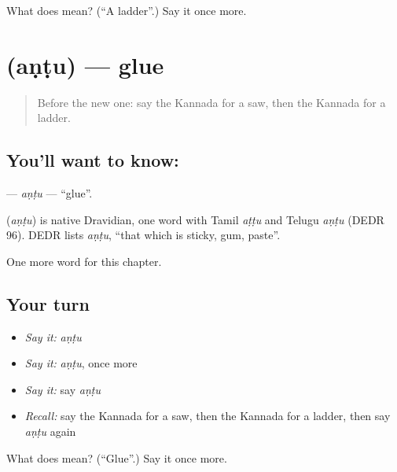 \begin{tcolorbox}[breakable,colback=teal!4,colframe=teal!35!black,title={Before you move on}]
What does  mean? (\textquotedblleft{}A ladder\textquotedblright{}.) Say it once more.
\end{tcolorbox}
\section[\texorpdfstring{\kn{ಅಂಟು} (aṇṭu)}{ಅಂಟು (aṇṭu)}]{ (aṇṭu) — glue}

\label{lesson:KA-C227-antu}



\begin{quote}
Before the new one: say the Kannada for a saw, then the Kannada for a ladder.
\end{quote}

\subsection*{You'll want to know: }
\textbf{} — \emph{aṇṭu} — \textquotedblleft{}glue\textquotedblright{}.

\begin{cousinweb}
\textbf{} (\emph{aṇṭu}) is native Dravidian, one word with Tamil \emph{aṭṭu} and Telugu \emph{aṇṭu} (DEDR 96). DEDR lists \emph{aṇṭu}, \textquotedblleft{}that which is sticky, gum, paste\textquotedblright{}.
\end{cousinweb}

\begin{grammarlens}[title={What you've built}]
One more word for this chapter.
\end{grammarlens}

\subsection*{Your turn}
\begin{itemize}
\raggedright
  \item \emph{Say it:} \emph{aṇṭu}
  \item \emph{Say it:} \emph{aṇṭu}, once more
  \item \emph{Say it:} say \emph{aṇṭu}
  \item \emph{Recall:} say the Kannada for a saw, then the Kannada for a ladder, then say \emph{aṇṭu} again
\end{itemize}

\begin{tcolorbox}[breakable,colback=teal!4,colframe=teal!35!black,title={Before you move on}]
What does  mean? (\textquotedblleft{}Glue\textquotedblright{}.) Say it once more.
\end{tcolorbox}
